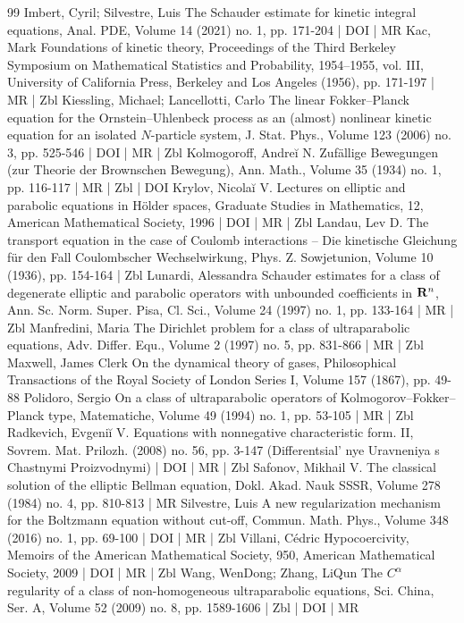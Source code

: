 \documentclass[10pt]{amsart}
\theoremstyle{definition}\newtheorem{defi}[theo]{Definition}\newtheorem{rema}[theo]{Remark}\newtheorem{exam}[theo]{Example}\newtheorem{exem}[theo]{Example}\newtheorem{nota}[theo]{Notation}
\begin{document}
\begin{thebibliography}{99}
Imbert, Cyril; Silvestre, Luis The Schauder estimate for kinetic integral equations, Anal. PDE, Volume 14 (2021) no. 1, pp. 171-204 | DOI | MR
Kac, Mark Foundations of kinetic theory, Proceedings of the Third Berkeley Symposium on Mathematical Statistics and Probability, 1954–1955, vol. III, University of California Press, Berkeley and Los Angeles (1956), pp. 171-197 | MR | Zbl
Kiessling, Michael; Lancellotti, Carlo The linear Fokker–Planck equation for the Ornstein–Uhlenbeck process as an (almost) nonlinear kinetic equation for an isolated ${N}$-particle system, J. Stat. Phys., Volume 123 (2006) no. 3, pp. 525-546 | DOI | MR | Zbl
Kolmogoroff, Andreĭ N. Zufällige Bewegungen (zur Theorie der Brownschen Bewegung), Ann. Math., Volume 35 (1934) no. 1, pp. 116-117 | MR | Zbl | DOI
Krylov, Nicolaĭ V. Lectures on elliptic and parabolic equations in Hölder spaces, Graduate Studies in Mathematics, 12, American Mathematical Society, 1996 | DOI | MR | Zbl
Landau, Lev D. The transport equation in the case of Coulomb interactions – Die kinetische Gleichung für den Fall Coulombscher Wechselwirkung, Phys. Z. Sowjetunion, Volume 10 (1936), pp. 154-164 | Zbl
Lunardi, Alessandra Schauder estimates for a class of degenerate elliptic and parabolic operators with unbounded coefficients in ${\bf {R}}^n$, Ann. Sc. Norm. Super. Pisa, Cl. Sci., Volume 24 (1997) no. 1, pp. 133-164 | MR | Zbl
Manfredini, Maria The Dirichlet problem for a class of ultraparabolic equations, Adv. Differ. Equ., Volume 2 (1997) no. 5, pp. 831-866 | MR | Zbl
Maxwell, James Clerk On the dynamical theory of gases, Philosophical Transactions of the Royal Society of London Series I, Volume 157 (1867), pp. 49-88
Polidoro, Sergio On a class of ultraparabolic operators of Kolmogorov–Fokker–Planck type, Matematiche, Volume 49 (1994) no. 1, pp. 53-105 | MR | Zbl
Radkevich, Evgeniĭ V. Equations with nonnegative characteristic form. II, Sovrem. Mat. Prilozh. (2008) no. 56, pp. 3-147 (Differentsial' nye Uravneniya s Chastnymi Proizvodnymi) | DOI | MR | Zbl
Safonov, Mikhail V. The classical solution of the elliptic Bellman equation, Dokl. Akad. Nauk SSSR, Volume 278 (1984) no. 4, pp. 810-813 | MR
Silvestre, Luis A new regularization mechanism for the Boltzmann equation without cut-off, Commun. Math. Phys., Volume 348 (2016) no. 1, pp. 69-100 | DOI | MR | Zbl
Villani, Cédric Hypocoercivity, Memoirs of the American Mathematical Society, 950, American Mathematical Society, 2009 | DOI | MR | Zbl
Wang, WenDong; Zhang, LiQun The ${C}^\alpha $ regularity of a class of non-homogeneous ultraparabolic equations, Sci. China, Ser. A, Volume 52 (2009) no. 8, pp. 1589-1606 | Zbl | DOI | MR
\end{thebibliography}
\end{document}
